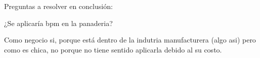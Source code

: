 Preguntas a resolver en conclusión:

¿Se aplicaría bpm en la panaderia?

Como negocio si, porque está dentro de la indutria manufacturera (algo asi)
pero como es chica, no porque no tiene sentido aplicarla debido al su costo.
